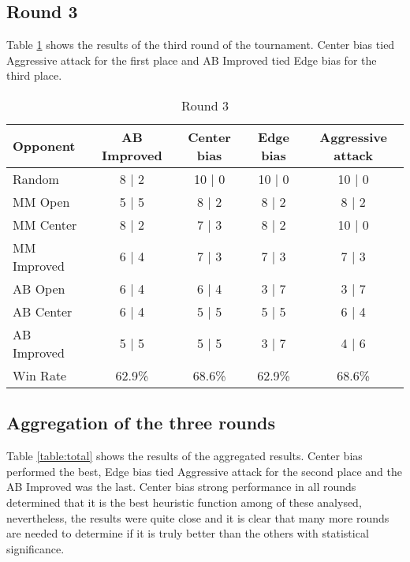 \documentclass[11pt]{article}
\begin{document}
\subsection{Round 3}

Table \ref{table:round3} shows the results of the third round of the tournament. Center bias tied Aggressive attack for the first place and AB Improved tied Edge bias for the third place.

\begin{table}[h!]
  \centering
  \caption{Round 3}
  \bigskip  
  \label{table:round3}
  \begin{tabular}{l|c|c|c|c}
    Opponent & AB Improved & Center bias & Edge bias & Aggressive attack \\
    \hline
    Random & 8 | 2 & 10 | 0 & 10 | 0 & 10 | 0 \\
    MM Open & 5 | 5 & 8 | 2 & 8 | 2 & 8 | 2 \\
    MM Center & 8 | 2 & 7 | 3 & 8 | 2 & 10 | 0 \\
    MM Improved & 6 | 4 & 7 | 3 & 7 | 3 & 7 | 3 \\
    AB Open & 6 | 4 & 6 | 4 & 3 | 7 & 3 | 7 \\
    AB Center & 6 | 4 & 5 | 5 & 5 | 5 & 6 | 4 \\
    AB Improved & 5 | 5 & 5 | 5 & 3 | 7 & 4 | 6 \\
    \hline
    Win Rate & 62.9\% & 68.6\% & 62.9\% & 68.6\%
  \end{tabular}
\end{table}

\subsection{Aggregation of the three rounds}

Table \ref{table:total} shows the results of the aggregated results. Center bias performed the best, Edge bias tied Aggressive attack for the second place and the AB Improved was the last. Center bias strong performance in all rounds determined that it is the best heuristic function among of these analysed, nevertheless, the results were quite close and it is clear that many more rounds are needed to determine if it is truly better than the others with statistical significance.
\end{document}
